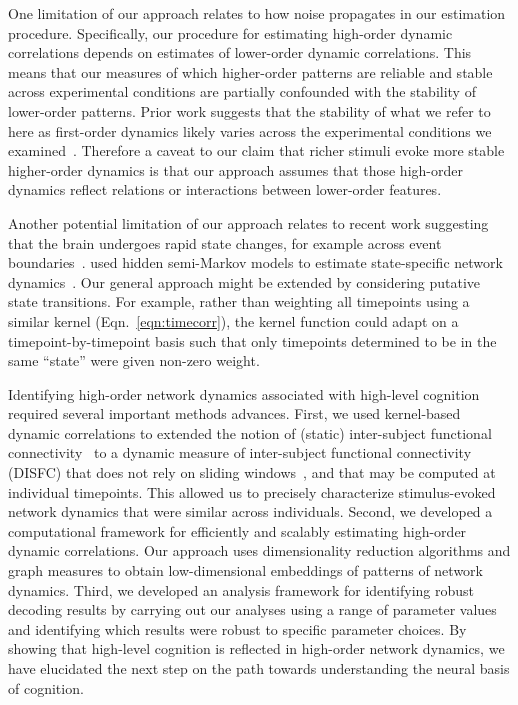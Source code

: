 \documentclass[english]{article}
\begin{document}
One limitation of our approach relates to how noise propagates in our
estimation procedure.  Specifically, our procedure for estimating
high-order dynamic correlations depends on estimates of lower-order
dynamic correlations.  This means that our measures of which
higher-order patterns are reliable and stable across experimental
conditions are partially confounded with the stability of lower-order
patterns.  Prior work suggests that the stability of what we refer to
here as first-order dynamics likely varies across the experimental
conditions we examined~\cite{SimoEtal16}.  Therefore a caveat to our
claim that richer stimuli evoke more stable higher-order dynamics is
that our approach assumes that those high-order dynamics reflect
relations or interactions between lower-order features.

Another potential limitation of our approach relates to recent work
suggesting that the brain undergoes rapid state changes, for example
across event boundaries~\cite{BaldEtal17}.
\cite{ShapEtal19} used hidden semi-Markov models to estimate
state-specific network dynamics~\cite{VidaEtal18}.  Our
general approach might be extended by considering putative state
transitions. For example, rather than weighting all timepoints using a
similar kernel (Eqn.~\ref{eqn:timecorr}), the kernel function could
adapt on a timepoint-by-timepoint basis such that only timepoints
determined to be in the same ``state'' were given non-zero weight.

Identifying high-order network dynamics associated with high-level
cognition required several important methods advances.  First, we used
kernel-based dynamic correlations to extended the notion of (static)
inter-subject functional connectivity~\cite{SimoEtal16} to a dynamic
measure of inter-subject functional connectivity (DISFC) that does not
rely on sliding windows~\cite{MannEtal18}, and that
may be computed at individual timepoints.  This allowed us to
precisely characterize stimulus-evoked network dynamics that were
similar across individuals.  Second, we developed a computational
framework for efficiently and scalably estimating high-order dynamic
correlations.  Our approach uses dimensionality reduction algorithms
and graph measures to obtain low-dimensional embeddings of patterns of
network dynamics.  Third, we developed an analysis framework for
identifying robust decoding results by carrying out our analyses using
a range of parameter values and identifying which results were robust
to specific parameter choices. By showing that high-level cognition is
reflected in high-order network dynamics, we have elucidated the next
step on the path towards understanding the neural basis of cognition.
\end{document}
